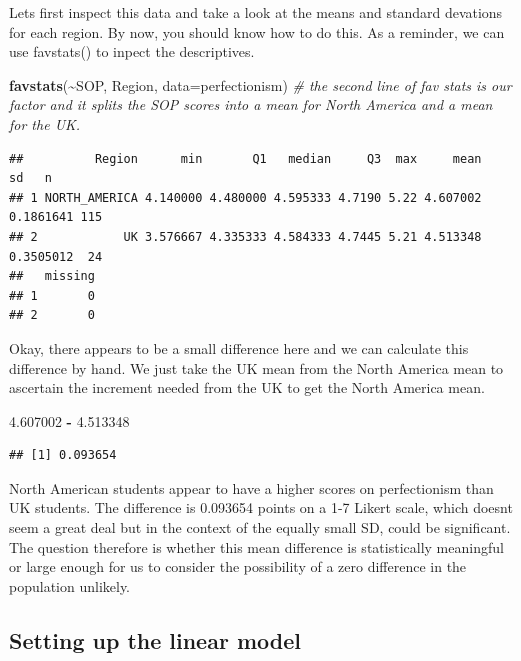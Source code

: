 \documentclass[
]{article}
\newenvironment{Shaded}{\begin{snugshade}}{\end{snugshade}}
\newcommand{\AttributeTok}[1]{\textcolor[rgb]{0.13,0.29,0.53}{#1}}
\newcommand{\CommentTok}[1]{\textcolor[rgb]{0.56,0.35,0.01}{\textit{#1}}}
\newcommand{\FloatTok}[1]{\textcolor[rgb]{0.00,0.00,0.81}{#1}}
\newcommand{\FunctionTok}[1]{\textcolor[rgb]{0.13,0.29,0.53}{\textbf{#1}}}
\newcommand{\NormalTok}[1]{#1}
\newcommand{\SpecialCharTok}[1]{\textcolor[rgb]{0.81,0.36,0.00}{\textbf{#1}}}
\begin{document}
Lets first inspect this data and take a look at the means and standard
devations for each region. By now, you should know how to do this. As a
reminder, we can use favstats() to inpect the descriptives.

\begin{Shaded}
\begin{Highlighting}[]
\FunctionTok{favstats}\NormalTok{(}\SpecialCharTok{\textasciitilde{}}\NormalTok{SOP, Region, }\AttributeTok{data=}\NormalTok{perfectionism) }\CommentTok{\# the second line of fav stats is our factor and it splits the SOP scores into a mean for North America and a mean for the UK.}
\end{Highlighting}
\end{Shaded}

\begin{verbatim}
##          Region      min       Q1   median     Q3  max     mean        sd   n
## 1 NORTH_AMERICA 4.140000 4.480000 4.595333 4.7190 5.22 4.607002 0.1861641 115
## 2            UK 3.576667 4.335333 4.584333 4.7445 5.21 4.513348 0.3505012  24
##   missing
## 1       0
## 2       0
\end{verbatim}

Okay, there appears to be a small difference here and we can calculate
this difference by hand. We just take the UK mean from the North America
mean to ascertain the increment needed from the UK to get the North
America mean.

\begin{Shaded}
\begin{Highlighting}[]
\FloatTok{4.607002} \SpecialCharTok{{-}} \FloatTok{4.513348}
\end{Highlighting}
\end{Shaded}

\begin{verbatim}
## [1] 0.093654
\end{verbatim}

North American students appear to have a higher scores on perfectionism
than UK students. The difference is 0.093654 points on a 1-7 Likert
scale, which doesnt seem a great deal but in the context of the equally
small SD, could be significant. The question therefore is whether this
mean difference is statistically meaningful or large enough for us to
consider the possibility of a zero difference in the population
unlikely.

\subsection{Setting up the linear
model}\label{setting-up-the-linear-model-1}
\end{document}
